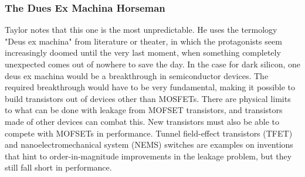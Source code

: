 
\subsubsection{The Dues Ex Machina Horseman}
Taylor notes that this one is the most unpredictable\cite{dark-silicon}.
He uses the termology "Deus ex machina" from literature or theater, in which the protagonists seem increasingly doomed until the very last moment, when something completely unexpected comes out of nowhere to save the day.
In the case for dark silicon, one deus ex machina would be a breakthrough in semiconductor devices.
The required breakthrough would have to be very fundamental, making it possible to build transistors out of devices other than MOSFETs. 
There are physical limits to what can be done with leakage from MOFSET transistors, and transistors made of other devices can combat this.
New transistors must also be able to compete with MOFSETs in performance.
Tunnel field-effect transistors (TFET) and nanoelectromechanical system (NEMS) switches are examples on inventions that hint to order-in-magnitude improvements in the leakage problem, but they still fall short in performance.

